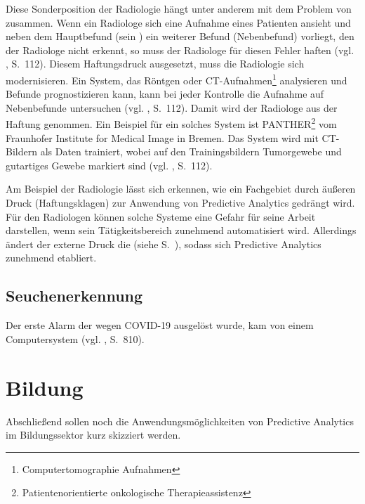 Diese Sonderposition der Radiologie hängt unter anderem mit dem Problem von \grqq{} zusammen.
Wenn ein Radiologe sich eine Aufnahme eines Patienten ansieht und neben dem Hauptbefund (sein \grqq{})
ein weiterer Befund (Nebenbefund) vorliegt, den der Radiologe nicht erkennt, so muss der Radiologe für diesen Fehler haften
(vgl. \cite{Jorzig}, S.~112). Diesem Haftungsdruck ausgesetzt, muss die Radiologie sich modernisieren. Ein System,
das Röntgen oder CT-Aufnahmen\footnote{Computertomographie Aufnahmen} analysieren und Befunde prognostizieren kann, kann
bei jeder Kontrolle die Aufnahme auf Nebenbefunde untersuchen (vgl. \cite{Jorzig}, S.~112).
Damit wird der Radiologe aus der Haftung genommen. Ein Beispiel für ein solches System ist
PANTHER\footnote{Patientenorientierte onkologische Therapieassistenz} vom Fraunhofer Institute for Medical Image in Bremen.
Das System wird mit CT-Bildern als Daten trainiert, wobei auf den Trainingsbildern Tumorgewebe und gutartiges Gewebe markiert sind
(vgl. \cite{Jorzig}, S.~112).

Am Beispiel der Radiologie lässt sich erkennen, wie ein Fachgebiet durch äußeren Druck (Haftungsklagen) zur Anwendung von Predictive
Analytics gedrängt wird. Für den Radiologen können solche Systeme eine Gefahr für seine Arbeit darstellen, wenn sein Tätigkeitsbereich
zunehmend automatisiert wird. Allerdings ändert der externe Druck die \grqq{} (siehe S.~\xcom), sodass
sich Predictive Analytics zunehmend etabliert.

\subsection{Seuchenerkennung}

Der erste Alarm der wegen COVID-19 ausgelöst wurde, kam von einem Computersystem (vgl. \cite{Cho}, S.~810).




\section{Bildung}

Abschließend sollen noch die Anwendungsmöglichkeiten von Predictive Analytics
im Bildungssektor kurz skizziert werden.

